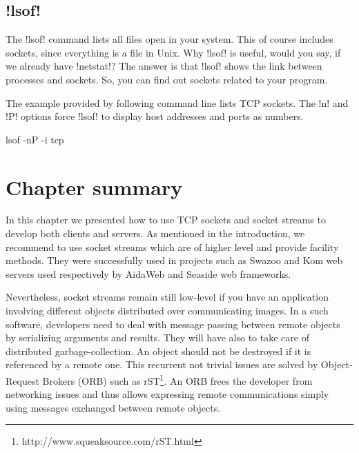 \documentclass[a4paper,10pt,twoside]{book}
\begin{document}
\subsection{\ct!lsof!}
The \ct!lsof! command lists all files open in your system.
This of course includes sockets, since everything is a file in Unix.
Why \ct!lsof! is useful, would you say, if we already have \ct!netstat!?
The answer is that \ct!lsof! shows the link between processes and sockets.
So, you can find out sockets related to your program.

The example provided by following command line lists TCP sockets.
The \ct!n! and \ct!P! options force \ct!lsof! to display host addresses and ports as numbers. 
\begin{code}{}
lsof -nP -i tcp
\end{code}


\section{Chapter summary}
In this chapter we presented how to use TCP sockets and socket streams to develop both clients and servers.
As mentioned in the introduction, we recommend to use socket streams which are of higher level and provide facility methods.
They were successfully used in projects such as Swazoo and Kom web servers used respectively by AidaWeb and Seaside web frameworks.

Nevertheless, socket streams remain still low-level if you have an application involving different objects distributed over communicating images.
In a such software, developers need to deal with message passing between remote objects by serializing arguments and results.
They will have also to take care of distributed garbage-collection.
An object should not be destroyed if it is referenced by a remote one.
This recurrent not trivial issues are solved by Object-Request Brokers (ORB) such as rST\footnote{http://www.squeaksource.com/rST.html}.
An ORB frees the developer from networking issues and thus allows expressing remote communications simply using messages exchanged between remote objects.



\ifx\wholebook\relax\else
\end{document}
